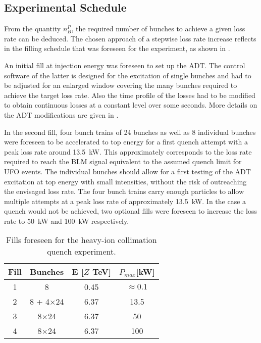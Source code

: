 \subsection{Experimental Schedule}


From the quantity $n_B^P$, the required number of bunches to achieve a given loss rate can be deduced. The chosen approach of a stepwise loss rate increase reflects in the filling schedule that was foreseen for the experiment, as shown in . 

An initial fill at injection energy was foreseen to set up the \acrshort{ADT}. The control software of the latter is designed for the excitation of single bunches and had to be adjusted for an enlarged window covering the many bunches required to achieve the target loss rate. Also the time profile of the losses had to be modified to obtain continuous losses at a constant level over some seconds. More details on the ADT modifications are given in \cite{ACC-NOTE-16-0031}.  

In the second fill, four bunch trains of 24 bunches as well as 8 individual bunches were foreseen to be accelerated to top energy for a first quench attempt with a peak loss rate around 13.5~kW. This approximately corresponds to the loss rate required to reach the BLM signal equivalent to the assumed quench limit for UFO events. The individual bunches should allow for a first testing of the ADT excitation at top energy  with small intensities, without the risk of outreaching the envisaged loss rate. The four bunch trains carry enough particles to allow multiple attempts at a peak loss rate of approximately 13.5~kW. In the case a quench would not be achieved, two optional fills were foreseen to increase the loss rate to 50~kW and 100~kW respectively. 

	\begin{table}[b]
		\centering
		\caption{Fills foreseen for the heavy-ion collimation quench experiment.}
		\label{tab:filling_scheme}
		\begin{tabular}{cccc}
                  \toprule
		Fill & Bunches & E {[}$Z$ TeV{]} & $P_{max}${[}kW{]} \\ \midrule
		1    & 8     & 0.45          & $\approx 0.1$        \\
		2    & 8 + 4$\times$24  & 6.37          & 13.5       \\
		3    & 8$\times$24  & 6.37          & 50     \\
		4    & 8$\times$24  & 6.37          & 100        \\ \midrule
		\bottomrule
		\end{tabular}
	\end{table}



